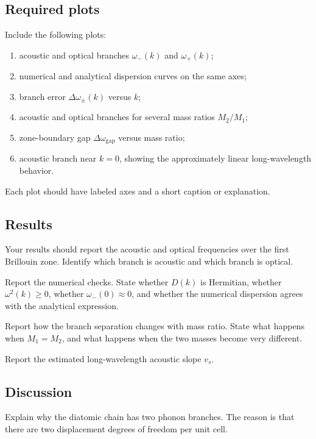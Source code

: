 \subsection{Required plots}

Include the following plots:

\begin{enumerate}
    \item acoustic and optical branches \(\omega_-(k)\) and \(\omega_+(k)\);
    \item numerical and analytical dispersion curves on the same axes;
    \item branch error \(\Delta\omega_{\pm}(k)\) versus \(k\);
    \item acoustic and optical branches for several mass ratios \(M_2/M_1\);
    \item zone-boundary gap \(\Delta\omega_{\mathrm{gap}}\) versus mass ratio;
    \item acoustic branch near \(k=0\), showing the approximately linear long-wavelength behavior.
\end{enumerate}

Each plot should have labeled axes and a short caption or explanation.

\subsection{Results}

Your results should report the acoustic and optical frequencies over the first Brillouin zone. Identify which branch is acoustic and which branch is optical.

Report the numerical checks. State whether \(D(k)\) is Hermitian, whether \(\omega^2(k)\ge0\), whether \(\omega_-(0)\approx0\), and whether the numerical dispersion agrees with the analytical expression.

Report how the branch separation changes with mass ratio. State what happens when \(M_1=M_2\), and what happens when the two masses become very different.

Report the estimated long-wavelength acoustic slope \(v_s\).

\subsection{Discussion}

Explain why the diatomic chain has two phonon branches. The reason is that there are two displacement degrees of freedom per unit cell.

